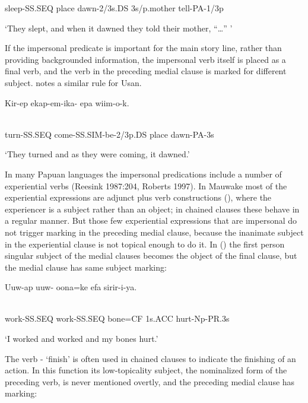 sleep-SS.SEQ  place  dawn-2/3s.DS  3s/p.mother  tell-PA-1/3p

`They slept, and when it dawned they told their mother, ``{\dots}'' '

If the impersonal predicate is important for the main story line, rather than providing backgrounded information, the impersonal verb itself is placed as a final verb, and the verb in the preceding medial clause is marked for different subject. \citet[206]{Reesink1987} notes a similar rule for Usan. 

\ea%
\label{ex:x1492}
\gll Kir-ep  ekap-em-ika-  epa  wiim-o-k. \\
      \\
\glt
\z

turn-SS.SEQ  come-SS.SIM-be-2/3p.DS  place  dawn-PA-3s

`They turned and as they were coming, it dawned.'

In many Papuan languages the impersonal predications include a number of experiential verbs (Reesink 1987:204, Roberts 1997). In Mauwake most of the experiential expressions are adjunct plus verb constructions (), where the experiencer is a subject rather than an object; in chained clauses these behave in a regular\textstyleAcronymallcaps{} manner. But those few experiential expressions that are impersonal do not trigger  marking in the preceding medial clause, because the inanimate subject in the experiential clause is not topical enough to do it. In () the first person singular subject of the medial clauses becomes the object of the final clause, but the medial clause has same subject marking:

\ea%
\label{ex:x1491}
\gll Uuw-ap  uuw-  oona=ke  efa  sirir-i-ya. \\
      \\
\glt
\z

work-SS.SEQ  work-SS.SEQ  bone=CF  1s.ACC  hurt-Np-PR.3s

`I worked and worked and my bones hurt.'

The verb - `finish' is often used in chained clauses to indicate the finishing of an action. In this function its low-topicality subject, the nominalized form of the preceding verb, is never mentioned overtly, and the preceding medial clause has  marking:

